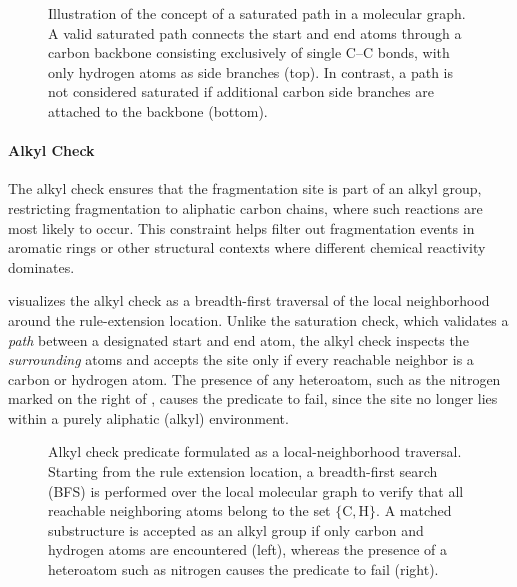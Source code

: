 \begin{figure}[H]
    \centering
    
    \caption[Saturation check predicate as constrained path traversal]{
        Illustration of the concept of a saturated path in a molecular graph.
        A valid saturated path connects the start and end atoms through a carbon backbone consisting exclusively of single C--C bonds, with only hydrogen atoms as side branches (top).
        In contrast, a path is not considered saturated if additional carbon side branches are attached to the backbone (bottom).
    }
    \label{fig:saturation-check}
\end{figure}

\paragraph{Alkyl Check}
The alkyl check ensures that the fragmentation site is part of an alkyl group, restricting fragmentation to aliphatic carbon chains, where such reactions are most likely to occur.
This constraint helps filter out fragmentation events in aromatic rings or other structural contexts where different chemical reactivity dominates.

 visualizes the alkyl check as a breadth-first traversal of the local neighborhood around the rule-extension location.
Unlike the saturation check, which validates a \emph{path} between a designated start and end atom, the alkyl check inspects the \emph{surrounding} atoms and accepts the site only if every reachable neighbor is a carbon or hydrogen atom.
The presence of any heteroatom, such as the nitrogen marked on the right of , causes the predicate to fail, since the site no longer lies within a purely aliphatic (alkyl) environment.

\begin{figure}[H]
    \centering
    
    \caption[Alkyl check predicate]{
        Alkyl check predicate formulated as a local-neighborhood traversal.
        Starting from the rule extension location, a breadth-first search (BFS) is performed over the local molecular graph to verify that all reachable neighboring atoms belong to the set \(\{ \mathrm{C}, \mathrm{H} \}\).
        A matched substructure is accepted as an alkyl group if only carbon and hydrogen atoms are encountered (left), whereas the presence of a heteroatom such as nitrogen causes the predicate to fail (right).
    }
    \label{fig:alkyl-check}
\end{figure}

